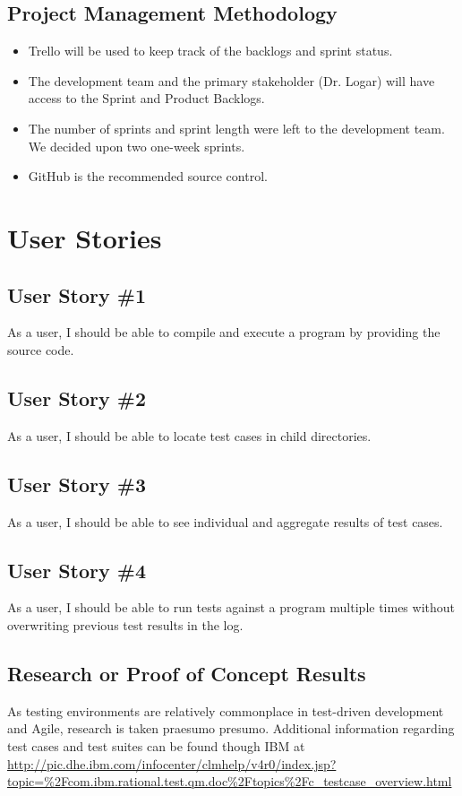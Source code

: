 \subsection{Project  Management Methodology} 
 
\begin{itemize}
\item Trello will be used to keep track of the backlogs and sprint status.
\item The development team and the primary stakeholder (Dr. Logar) will have access to the Sprint and Product Backlogs.
\item The number of sprints and sprint length were left to the development team. We decided upon two one-week sprints.
\item GitHub is the recommended source control.
\end{itemize}

\section{User Stories}
\subsection{User Story \#1}
As a user, I should be able to compile and execute a program by providing the source code.

\subsection{User Story \#2} 
As a user, I should be able to locate test cases in child directories.

\subsection{User Story \#3} 
As a user, I should be able to see individual and aggregate results of test cases.

\subsection{User Story \#4}
As a user, I should be able to run tests against a program multiple times without overwriting previous test results in the log.

\subsection {Research or Proof of Concept Results}
As testing environments are relatively commonplace in test-driven development and Agile, research is taken praesumo presumo.  Additional information regarding test cases and test suites can be found though IBM at \url{http://pic.dhe.ibm.com/infocenter/clmhelp/v4r0/index.jsp?topic=%2Fcom.ibm.rational.test.qm.doc%2Ftopics%2Fc_testcase_overview.html}

